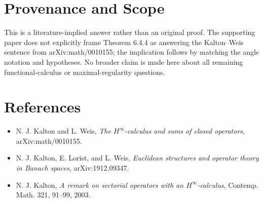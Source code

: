 \documentclass[11pt]{article}
\begin{document}
\section*{Provenance and Scope}

This is a literature-implied answer rather than an original proof.  The
supporting paper does not explicitly frame Theorem 6.4.4 as answering the
Kalton--Weis sentence from arXiv:math/0010155; the implication follows by
matching the angle notation and hypotheses.  No broader claim is made here
about all remaining functional-calculus or maximal-regularity questions.

\section*{References}

\begin{itemize}
\item N. J. Kalton and L. Weis, \emph{The \(H^\infty\)-calculus and sums of
closed operators}, arXiv:math/0010155.
\item N. J. Kalton, E. Lorist, and L. Weis, \emph{Euclidean structures and
operator theory in Banach spaces}, arXiv:1912.09347.
\item N. J. Kalton, \emph{A remark on sectorial operators with an
\(H^\infty\)-calculus}, Contemp. Math. 321, 91--99, 2003.
\end{itemize}
\end{document}
